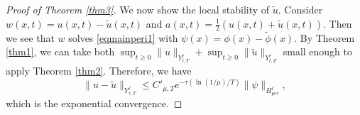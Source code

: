 \documentclass[10pt,a4paper,final]{article}
\numberwithin{equation}{section}
\newcommand{\N}{\mathbb{N}}
\begin{document}
\begin{proof}[Proof of Theorem \ref{thm3}]
    We now show the local stability of $\widetilde{u}$. Consider $w(x,t)=u(x,t)-\widetilde{u}(x,t)$ and $a(x,t)=\frac{1}{2}(u(x,t)+\widetilde{u}(x,t))$. Then we see that $w$ solves \eqref{eqmainperi1} with $\psi(x)=\phi(x)-\widetilde{\phi}(x)$. By Theorem \ref{thm1}, we can take both $\sup_{t\geq 0}\|u\|_{Y^{\ell}_{t,T}}+\sup_{t\geq 0}\|\widetilde{u}\|_{Y^{\ell}_{t,T}}$ small enough to apply Theorem \ref{thm2}. Therefore, we have 
    $$\|u-\widetilde{u}\|_{Y^{\ell}_{\tau,T}}\leq C'_{\mu,T}e^{-\tau(\ln(1/\mu)/T)}\|\psi\|_{H^{\ell}_{per}},$$
    which is the exponential convergence.  
\end{proof}





\end{document}
